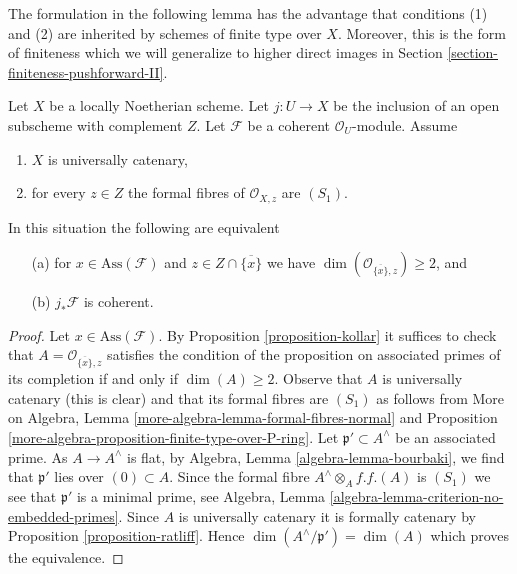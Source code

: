 \noindent
The formulation in the following lemma has the advantage that conditions
(1) and (2) are inherited by schemes of finite type over $X$.
Moreover, this is the form of finiteness which we will generalize
to higher direct images in Section \ref{section-finiteness-pushforward-II}.

\begin{lemma}
\label{lemma-finiteness-pushforward-general}
Let $X$ be a locally Noetherian scheme.
Let $j : U \to X$ be the inclusion of an
open subscheme with complement $Z$. Let $\mathcal{F}$ be a coherent
$\mathcal{O}_U$-module. Assume
\begin{enumerate}
\item $X$ is universally catenary,
\item for every $z \in Z$ the formal fibres of $\mathcal{O}_{X, z}$
are $(S_1)$.
\end{enumerate}
In this situation the following are equivalent
\begin{enumerate}
\item[(a)] for $x \in \text{Ass}(\mathcal{F})$ and
$z \in Z \cap \overline{\{x\}}$ we have
$\dim(\mathcal{O}_{\overline{\{x\}}, z}) \geq 2$, and
\item[(b)] $j_*\mathcal{F}$ is coherent.
\end{enumerate}
\end{lemma}

\begin{proof}
Let $x \in \text{Ass}(\mathcal{F})$. By Proposition \ref{proposition-kollar}
it suffices to check that $A = \mathcal{O}_{\overline{\{x\}}, z}$ satisfies
the condition of the proposition on associated primes of its completion
if and only if $\dim(A) \geq 2$.
Observe that $A$ is universally catenary (this is clear)
and that its formal fibres are $(S_1)$ as follows from
More on Algebra, Lemma \ref{more-algebra-lemma-formal-fibres-normal} and
Proposition \ref{more-algebra-proposition-finite-type-over-P-ring}.
Let $\mathfrak p' \subset A^\wedge$ be an associated prime.
As $A \to A^\wedge$ is flat,
by Algebra, Lemma \ref{algebra-lemma-bourbaki},
we find that $\mathfrak p'$ lies over $(0) \subset A$.
Since the formal fibre $A^\wedge \otimes_A f.f.(A)$
is $(S_1)$ we see that $\mathfrak p'$ is a minimal prime, see
Algebra, Lemma \ref{algebra-lemma-criterion-no-embedded-primes}.
Since $A$ is universally catenary it is formally catenary
by Proposition \ref{proposition-ratliff}.
Hence $\dim(A^\wedge/\mathfrak p') = \dim(A)$ which
proves the equivalence.
\end{proof}







